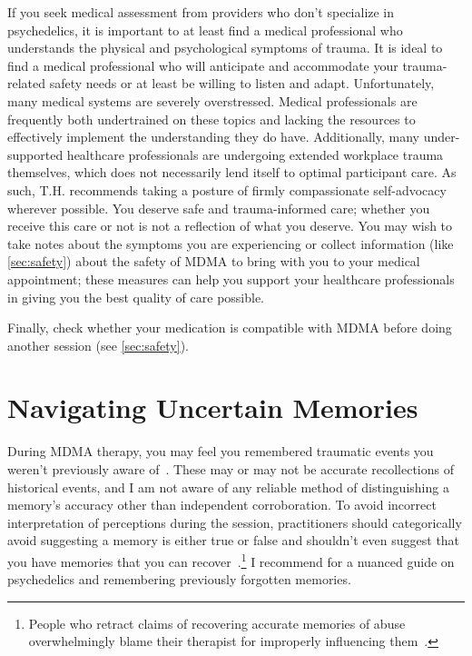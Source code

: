\documentclass[11pt,oneside]{book}
\let\cite\parencite
\newcommand{\writtenByDay}[1]{#1}
\begin{document}
\writtenByDay{
If you seek medical assessment from providers who don't specialize in psychedelics, it is important to at least find a medical professional who understands the physical and psychological symptoms of trauma. It is ideal to find a medical professional who will anticipate and accommodate your trauma-related safety needs or at least be willing to listen and adapt. Unfortunately, many medical systems are severely overstressed. Medical professionals are frequently both undertrained on these topics and lacking the resources to effectively implement the understanding they do have. Additionally, many under-supported healthcare professionals are undergoing extended workplace trauma themselves, which does not necessarily lend itself to optimal participant care. As such, T.H. recommends taking a posture of firmly compassionate self-advocacy wherever possible. You deserve safe and trauma-informed care; whether you receive this care or not is not a reflection of what you deserve. You may wish to take notes about the symptoms you are experiencing or collect information (like \cref{sec:safety}) about the safety of MDMA to bring with you to your medical appointment; these measures can help you support your healthcare professionals in giving you the best quality of care possible.
}

Finally, check whether your medication is compatible with MDMA before doing another session (see \cref{sec:safety}).

\section{Navigating Uncertain Memories}
\label{navigating}
During MDMA therapy, you may feel you remembered traumatic events you weren't previously aware of~\cite{psychedelicrecoveredmemory}. These may or may not be accurate recollections of historical events, and I am not aware of any reliable method of distinguishing a memory's accuracy other than independent corroboration. To avoid incorrect interpretation of perceptions during the session, practitioners should categorically avoid suggesting a memory is either true or false and shouldn't even suggest that you have memories that you can recover~\cite{otgaarMemory}.\footnote{People who retract claims of recovering accurate memories of abuse overwhelmingly blame their therapist for improperly influencing them~\cite{otgaarMemory}.} I recommend \textcite{psychedelicrecoveredmemory} for a nuanced guide on psychedelics and remembering previously forgotten memories.
\end{document}
